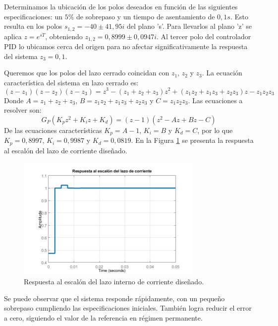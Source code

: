 Determinamos la ubicación de los polos deseados en función de las siguientes especificaciones: un $5\%$ de sobrepaso y un tiempo de asentamiento de $0,1s$. Esto resulta en los polos $s_{1,2}=-40\pm 41,95i$ del plano 's'. Para llevarlos al plano 'z' se aplica $z=e^{sT}$, obteniendo $z_{1,2}=0,8999\pm 0,0947i$. Al tercer polo del controlador PID lo ubicamos cerca del origen para no afectar significativamente la respuesta del sistema $z_3=0,1$.\par 
Queremos que los polos del lazo cerrado coincidan con $z_1$, $z_2$ y $z_3$. La ecuación característica del sistema en lazo cerrado es:
\begin{equation}
(z-z_1)(z-z_2)(z-z_3)=z^3-(z_1+z_2+z_3)z^2+(z_1z_2+z_1z_3+z_2z_3)z-z_1z_2z_3
\end{equation}
Donde $A=z_1+z_2+z_3$, $B=z_1z_2+z_1z_3+z_2z_3$ y $C=z_1z_2z_3$. Las ecuaciones a resolver son:
\begin{equation}
G_P(K_pz^2+K_iz+K_d)=(z-1)(z^2-Az+Bz-C)
\end{equation}
De las ecuaciones características $K_p=A-1$, $K_i=B$ y $K_d=C$, por lo que $K_p=0,8997$, $K_i=0,9987$ y $K_d=0,0819$. En la Figura  \ref{F:Resp_lazo_corriente} se presenta la respuesta al escalón del lazo de corriente diseñado.
\begin{figure} [H]
	\centering
	\includegraphics[width=0.8\textwidth]{./imagenes/Resp_lazo_corriente.jpg}
	\caption{Respuesta al escalón del lazo interno de corriente diseñado.}
	\label{F:Resp_lazo_corriente}
\end{figure} \par 
Se puede observar que el sistema responde rápidamente, con un pequeño sobrepaso cumpliendo las especificaciones iniciales. También logra reducir el error a cero, siguiendo el valor de la referencia en régimen permanente. \par 

